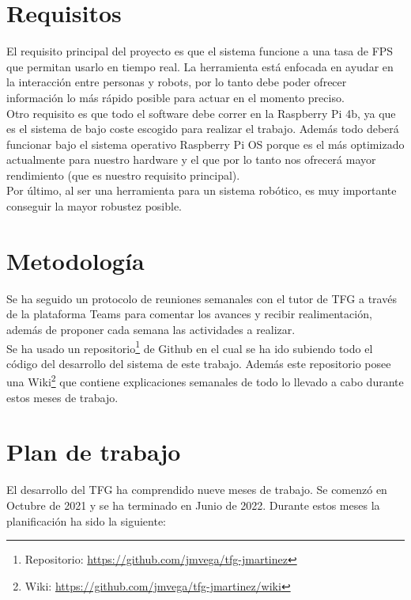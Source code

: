 \section{Requisitos}
\label{sec:requisitos}

El requisito principal del proyecto es que el sistema funcione a una tasa de FPS que permitan usarlo en tiempo real. La herramienta está enfocada en ayudar en la interacción entre personas y robots, por lo tanto debe poder ofrecer información lo más rápido posible para actuar en el momento preciso.\\

Otro requisito es que todo el software debe correr en la Raspberry Pi 4b, ya que es el sistema de bajo coste escogido para realizar el trabajo. Además todo deberá funcionar bajo el sistema operativo Raspberry Pi OS porque es el más optimizado actualmente para nuestro hardware y el que por lo tanto nos ofrecerá mayor rendimiento (que es nuestro requisito principal).\\

Por último, al ser una herramienta para un sistema robótico, es muy importante conseguir la mayor robustez posible.

\section{Metodología}
\label{sec:metodologia}

Se ha seguido un protocolo de reuniones semanales con el tutor de TFG a través de la plataforma Teams para comentar los avances y recibir realimentación, además de proponer cada semana las actividades a realizar.\\

Se ha usado un repositorio\footnote{Repositorio: \url{https://github.com/jmvega/tfg-jmartinez}} de Github en el cual se ha ido subiendo todo el código del desarrollo del sistema de este trabajo. Además este repositorio posee una Wiki\footnote{Wiki: \url{https://github.com/jmvega/tfg-jmartinez/wiki}} que contiene explicaciones semanales de todo lo llevado a cabo durante estos meses de trabajo.

\section{Plan de trabajo}
\label{sec:plantrabajo}

El desarrollo del TFG ha comprendido nueve meses de trabajo. Se comenzó en Octubre de 2021 y se ha terminado en Junio de 2022. Durante estos meses la planificación ha sido la siguiente:

